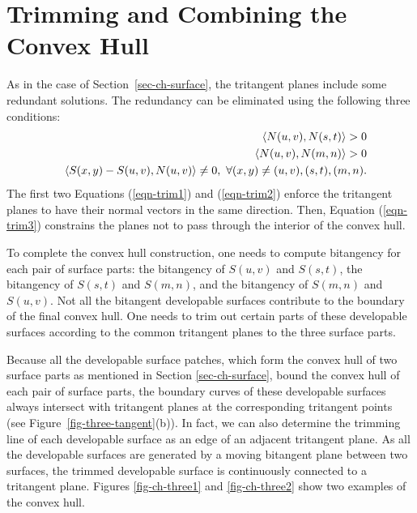 \documentclass{elsart}
\begin{document}
\section{Trimming and Combining the Convex Hull}
\label{sec-trim-combine}

As in the case of Section~\ref{sec-ch-surface}, the tritangent planes
include some redundant solutions.
The redundancy can be eliminated using the following three conditions:
\begin{eqnarray}
& & \inner{N(u,v)}{N(s,t)} > 0 \label{eqn-trim1} \\
& & \inner{N(u,v)}{N(m,n)} > 0 \label{eqn-trim2} \\
& & \inner{S(x,y) - S(u,v)}{N(u,v)} \neq 0,\ 
\forall (x,y) \neq (u,v), (s,t), (m,n). \label{eqn-trim3}
\end{eqnarray}
The first two Equations (\ref{eqn-trim1}) and (\ref{eqn-trim2}) enforce 
the tritangent planes to have their normal vectors in the same direction. 
Then, Equation (\ref{eqn-trim3}) constrains the planes
not to pass through the interior of the convex hull.

To complete the convex hull construction, one needs to compute 
bitangency for each pair of surface parts: the bitangency of $S(u,v)$ and 
$S(s,t)$, the bitangency of $S(s,t)$ and $S(m,n)$, and the bitangency
of $S(m,n)$ and $S(u,v)$. Not all the bitangent developable surfaces
contribute to the boundary of the final convex hull. One needs to trim out
certain parts of these developable surfaces according to
the common tritangent planes to the three surface parts.

Because all the developable surface patches, which form the convex hull of 
two surface parts as mentioned in Section \ref{sec-ch-surface}, bound
the convex hull of each pair of surface parts, the boundary curves of these 
developable surfaces always intersect with tritangent planes
at the corresponding tritangent points (see Figure~\ref{fig-three-tangent}(b)).
In fact, we can also determine the trimming line of each developable surface
as an edge of an adjacent tritangent plane.
As all the developable surfaces are generated by a moving bitangent plane 
between two surfaces, the trimmed developable surface is continuously 
connected to a tritangent plane.
Figures \ref{fig-ch-three1} and \ref{fig-ch-three2} show
two examples of the convex hull.
\end{document}
